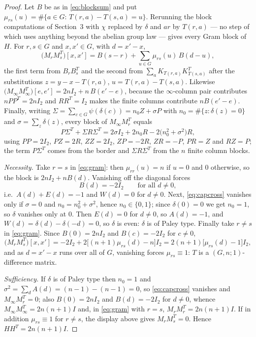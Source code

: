 \documentclass[11pt]{article}
\newcommand{\I}{I}
\begin{document}
\begin{proof}
Let \(B\) be as in \eqref{eq:blocksum} and put
\(\mu_{rs}(u)=\#\{a\in G:\,T(r,a)-T(s,a)=u\}\).  Rerunning the block
computations of Section~3 with \(\chi\) replaced by \(\delta\) and \(ar\) by
\(T(r,a)\) --- no step of which uses anything beyond the abelian group law
--- gives every Gram block of \(H\).  For \(r,s\in G\) and \(x,x'\in G\), with
\(d=x'-x\),
\[
        \bigl(M_rM_s^{T}\bigr)[x,x']
        =B(s-r)+\sum_{u\in G}\mu_{rs}(u)\,B(d-u),
        \tag{5.2}\label{eq:gram}
\]
the first term from \(B_rB_s^{T}\) and the second from
\(\sum_aK_{T(r,a)}K_{T(s,a)}^{T}\) after the substitutions
\(z=y-x-T(r,a)\), \(u=T(r,a)-T(s,a)\).  Likewise
\(\bigl(M_\infty M_\infty^{T}\bigr)[e,e']=2n\I_2+n\,B(e'-e)\), because the
\(\infty\)-column pair contributes \(nPP^{T}=2n\I_2\) and
\(RR^{T}=\I_2\) makes the finite columns contribute \(nB(e'-e)\).  Finally,
writing \(\Sigma=\sum_{c\in G}\psi(\delta(c))=n_0Z+\sigma P\) with
\(n_0=\#\{z:\delta(z)=0\}\) and \(\sigma=\sum_z\delta(z)\), every block of
\(M_\infty M_r^{T}\) equals
\[
        P\Sigma^{T}+\Sigma R\Sigma^{T}
        =2\sigma\I_2+2n_0R-2\bigl(n_0^{2}+\sigma^{2}\bigr)R,
        \tag{5.3}\label{eq:capcross}
\]
using \(PP=2\I_2\), \(PZ=2R\), \(ZZ=2\I_2\), \(ZP=-2R\), \(ZR=-P\),
\(PR=Z\) and \(RZ=P\); the term \(P\Sigma^{T}\) comes from the border and
\(\Sigma R\Sigma^{T}\) from the \(n\) finite column blocks.

\emph{Necessity.}  Take \(r=s\) in \eqref{eq:gram}: then
\(\mu_{rr}(u)=n\) if \(u=0\) and \(0\) otherwise, so the block is
\(2n\I_2+nB(d)\).  Vanishing off the diagonal forces
\[
        B(d)=-2\I_2\qquad\text{for all }d\neq0,
\]
i.e.\ \(A(d)+E(d)=-1\) and \(W(d)=0\) for \(d\neq0\).  Next,
\eqref{eq:capcross} vanishes only if \(\sigma=0\) and
\(n_0=n_0^{2}+\sigma^{2}\), hence \(n_0\in\{0,1\}\); since \(\delta(0)=0\) we
get \(n_0=1\), so \(\delta\) vanishes only at \(0\).  Then \(E(d)=0\) for
\(d\neq0\), so \(A(d)=-1\), and \(W(d)=\delta(d)-\delta(-d)=0\), so
\(\delta\) is even: \(\delta\) is of Paley type.  Finally take \(r\neq s\) in
\eqref{eq:gram}.  Since \(B(0)=2n\I_2\) and \(B(c)=-2\I_2\) for \(c\neq0\),
\[
        \bigl(M_rM_s^{T}\bigr)[x,x']
        =-2\I_2+2\bigl[(n+1)\mu_{rs}(d)-n\bigr]\I_2
        =2(n+1)\bigl[\mu_{rs}(d)-1\bigr]\I_2 ,
\]
and as \(d=x'-x\) runs over all of \(G\), vanishing forces
\(\mu_{rs}\equiv1\): \(T\) is a \((G,n;1)\)-difference matrix.

\emph{Sufficiency.}  If \(\delta\) is of Paley type then \(n_0=1\) and
\(\sigma^{2}=\sum_{d}A(d)=(n-1)-(n-1)=0\), so \eqref{eq:capcross} vanishes and
\(M_\infty M_r^{T}=0\); also \(B(0)=2n\I_2\) and \(B(d)=-2\I_2\) for
\(d\neq0\), whence \(M_\infty M_\infty^{T}=2n(n+1)\I\) and, in
\eqref{eq:gram} with \(r=s\), \(M_rM_r^{T}=2n(n+1)\I\).  If in addition
\(\mu_{rs}\equiv1\) for \(r\neq s\), the display above gives
\(M_rM_s^{T}=0\).  Hence \(HH^{T}=2n(n+1)\I\).
\end{proof}
\end{document}
